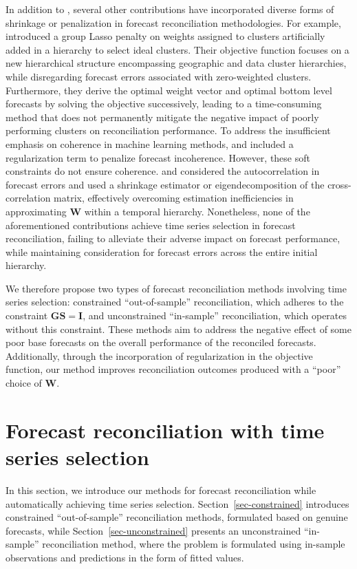 \documentclass[
  11pt]{article}
\theoremstyle{plain}
\theoremstyle{remark}
\begin{document}
In addition to \citet{Ben_Taieb2019-be}, several other contributions
have incorporated diverse forms of shrinkage or penalization in forecast
reconciliation methodologies. For example, \citet{Pang2022-hi}
introduced a group Lasso penalty on weights assigned to clusters
artificially added in a hierarchy to select ideal clusters. Their
objective function focuses on a new hierarchical structure encompassing
geographic and data cluster hierarchies, while disregarding forecast
errors associated with zero-weighted clusters. Furthermore, they derive
the optimal weight vector and optimal bottom level forecasts by solving
the objective successively, leading to a time-consuming method that does
not permanently mitigate the negative impact of poorly performing
clusters on reconciliation performance. To address the insufficient
emphasis on coherence in machine learning methods,
\citet{Mishchenko2019-as} and \citet{Gleason2020-fo} included a
regularization term to penalize forecast incoherence. However, these
soft constraints do not ensure coherence. \citet{Nystrup2020-te} and
\citet{Nystrup2021-di} considered the autocorrelation in forecast errors
and used a shrinkage estimator or eigendecomposition of the
cross-correlation matrix, effectively overcoming estimation
inefficiencies in approximating \(\bm{W}\) within a temporal hierarchy.
Nonetheless, none of the aforementioned contributions achieve time
series selection in forecast reconciliation, failing to alleviate their
adverse impact on forecast performance, while maintaining consideration
for forecast errors across the entire initial hierarchy.

We therefore propose two types of forecast reconciliation methods
involving time series selection: constrained ``out-of-sample''
reconciliation, which adheres to the constraint \(\bm{G}\bm{S}=\bm{I}\),
and unconstrained ``in-sample'' reconciliation, which operates without
this constraint. These methods aim to address the negative effect of
some poor base forecasts on the overall performance of the reconciled
forecasts. Additionally, through the incorporation of regularization in
the objective function, our method improves reconciliation outcomes
produced with a ``poor'' choice of \(\bm{W}\).

\section{Forecast reconciliation with time series
selection}\label{sec-methodology}

In this section, we introduce our methods for forecast reconciliation
while automatically achieving time series selection.
Section~\ref{sec-constrained} introduces constrained ``out-of-sample''
reconciliation methods, formulated based on genuine forecasts, while
Section~\ref{sec-unconstrained} presents an unconstrained ``in-sample''
reconciliation method, where the problem is formulated using in-sample
observations and predictions in the form of fitted values.
\end{document}
